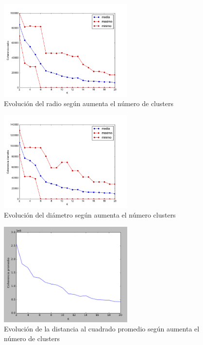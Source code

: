 \documentclass[11pt,a4paper]{article}
\begin{document}
\begin{figure}[h]
  \centering
  \includegraphics[width=0.6\textwidth]{img/radio_maxMin.png}
  \caption{Evolución del radio según aumenta el número de clusters}
  \label{fig:radio}
\end{figure}
\begin{figure}[h]
  \centering
  \includegraphics[width=0.6\textwidth]{img/diametro_maxMin.png}
  \caption{Evolución del diámetro según aumenta el número clusters}
  \label{fig:diametro}
\end{figure}

\begin{figure}[h]
  \centering
  \includegraphics[width=0.6\textwidth]{img/figure_P.png}
  \caption{Evolución de la distancia al cuadrado promedio según aumenta el número
    de clusters}
  \label{fig:promedio}
\end{figure}
\end{document}
